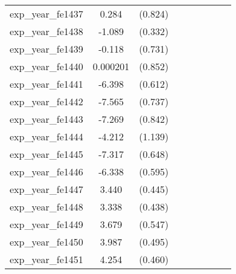 {\begin{tabular}{l*{4}{cc}}
exp\_year\_fe1437&    0.284         &  (0.824)&                  &         &                  &         &                  &         \\
exp\_year\_fe1438&   -1.089\sym{**} &  (0.332)&                  &         &                  &         &                  &         \\
exp\_year\_fe1439&   -0.118         &  (0.731)&                  &         &                  &         &                  &         \\
exp\_year\_fe1440& 0.000201         &  (0.852)&                  &         &                  &         &                  &         \\
exp\_year\_fe1441&   -6.398\sym{***}&  (0.612)&                  &         &                  &         &                  &         \\
exp\_year\_fe1442&   -7.565\sym{***}&  (0.737)&                  &         &                  &         &                  &         \\
exp\_year\_fe1443&   -7.269\sym{***}&  (0.842)&                  &         &                  &         &                  &         \\
exp\_year\_fe1444&   -4.212\sym{***}&  (1.139)&                  &         &                  &         &                  &         \\
exp\_year\_fe1445&   -7.317\sym{***}&  (0.648)&                  &         &                  &         &                  &         \\
exp\_year\_fe1446&   -6.338\sym{***}&  (0.595)&                  &         &                  &         &                  &         \\
exp\_year\_fe1447&    3.440\sym{***}&  (0.445)&                  &         &                  &         &                  &         \\
exp\_year\_fe1448&    3.338\sym{***}&  (0.438)&                  &         &                  &         &                  &         \\
exp\_year\_fe1449&    3.679\sym{***}&  (0.547)&                  &         &                  &         &                  &         \\
exp\_year\_fe1450&    3.987\sym{***}&  (0.495)&                  &         &                  &         &                  &         \\
exp\_year\_fe1451&    4.254\sym{***}&  (0.460)&                  &         &                  &         &                  &         \\

\end{tabular}}
